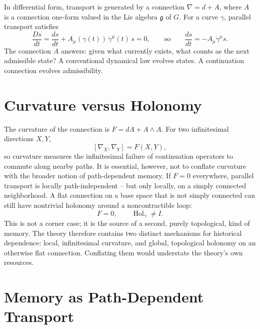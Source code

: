 \documentclass[11pt]{article}
\newcommand{\Hol}{\operatorname{Hol}}
\begin{document}
In differential form, transport is generated by a connection $\nabla = d + A$, where $A$ is a connection one-form valued in the Lie algebra $\mathfrak{g}$ of $G$. For a curve $\gamma$, parallel transport satisfies
\[
\frac{Ds}{dt} = \frac{ds}{dt} + A_\mu(\gamma(t))\,\dot\gamma^\mu(t)\, s = 0, \qquad \text{so} \qquad \frac{ds}{dt} = -A_\mu \dot\gamma^\mu s.
\]
The connection $A$ answers: given what currently exists, what counts as the next admissible state? A conventional dynamical law evolves states. A continuation connection evolves admissibility.

\section{Curvature versus Holonomy}

The curvature of the connection is $F = dA + A \wedge A$. For two infinitesimal directions $X, Y$,
\[
[\nabla_X, \nabla_Y] = F(X,Y),
\]
so curvature measures the infinitesimal failure of continuation operators to commute along nearby paths. It is essential, however, not to conflate curvature with the broader notion of path-dependent memory. If $F = 0$ everywhere, parallel transport is locally path-independent -- but only locally, on a simply connected neighborhood. A flat connection on a base space that is not simply connected can still have nontrivial holonomy around a noncontractible loop:
\[
F = 0, \qquad \Hol_\gamma \neq I.
\]
This is not a corner case; it is the source of a second, purely topological, kind of memory. The theory therefore contains two distinct mechanisms for historical dependence: local, infinitesimal curvature, and global, topological holonomy on an otherwise flat connection. Conflating them would understate the theory's own resources.

\section{Memory as Path-Dependent Transport}
\end{document}
